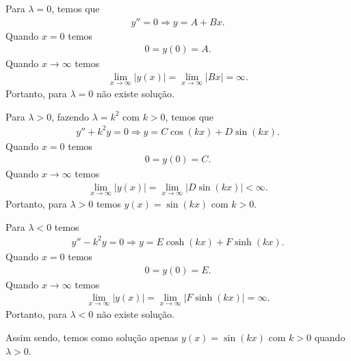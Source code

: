 \documentclass[a4paper,12pt, leqno, answers]{exam}
\begin{document}
\begin{questions}
\begin{parts}
\begin{solution}
            Para $\lambda = 0$, temos que
            \begin{align*}
                y'' = 0 \Rightarrow y = A + B x.
            \end{align*}
            Quando $x = 0$ temos
            \begin{align*}
                0 = y(0) = A.
            \end{align*}
            Quando $x \to \infty$ temos
            \begin{align*}
                \lim_{x \to \infty} | y(x) | = \lim_{x \to \infty} | B x | = \infty.
            \end{align*}
            Portanto, para $\lambda = 0$ n\~{a}o existe solu\c{c}\~{a}o.

            Para $\lambda > 0$, fazendo $\lambda = k^2$ com $k > 0$, temos que
            \begin{align*}
                y'' + k^2 y = 0 \Rightarrow y = C \cos(k x) + D \sin(k x).
            \end{align*}
            Quando $x = 0$ temos
            \begin{align*}
                0 = y(0) = C.
            \end{align*}
            Quando $x \to \infty$ temos
            \begin{align*}
                \lim_{x \to \infty} | y(x) | = \lim_{x \to \infty} | D \sin(k x) | < \infty.
            \end{align*}
            Portanto, para $\lambda > 0$ temos $y(x) = \sin(k x)$ com $k > 0$.

            Para $\lambda < 0$ temos
            \begin{align*}
                y'' - k^2 y = 0 \Rightarrow y = E \cosh(k x) + F \sinh(k x).
            \end{align*}
            Quando $x = 0$ temos
            \begin{align*}
                0 = y(0) = E.
            \end{align*}
            Quando $x \to \infty$ temos
            \begin{align*}
                \lim_{x \to \infty} | y(x) | = \lim_{x \to \infty} | F \sinh(k x) | = \infty.
            \end{align*}
            Portanto, para $\lambda < 0$ n\~{a}o existe solu\c{c}\~{a}o.

            Assim sendo, temos como solu\c{c}\~{a}o apenas $y(x) = \sin(k x)$ com $k > 0$ quando $\lambda > 0$.
            

\end{solution}
\end{parts}
\end{questions}
\end{document}
